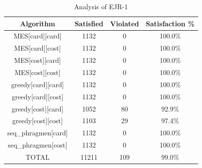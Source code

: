 \begin{table}[h]
\centering
\begin{tabular}{cccc}
\toprule
Algorithm & Satisfied & Violated & Satisfaction \% \\
\midrule
MES[card][card] & 1132 & 0 & 100.0\% \\
MES[card][cost] & 1132 & 0 & 100.0\% \\
MES[cost][card] & 1132 & 0 & 100.0\% \\
MES[cost][cost] & 1132 & 0 & 100.0\% \\
greedy[card][card] & 1132 & 0 & 100.0\% \\
greedy[card][cost] & 1132 & 0 & 100.0\% \\
greedy[cost][card] & 1052 & 80 & 92.9\% \\
greedy[cost][cost] & 1103 & 29 & 97.4\% \\
seq\_phragmen[card] & 1132 & 0 & 100.0\% \\
seq\_phragmen[cost] & 1132 & 0 & 100.0\% \\
TOTAL & 11211 & 109 & 99.0\% \\
\bottomrule
\end{tabular}
\caption{Analysis of EJR-1}
\end{table}
